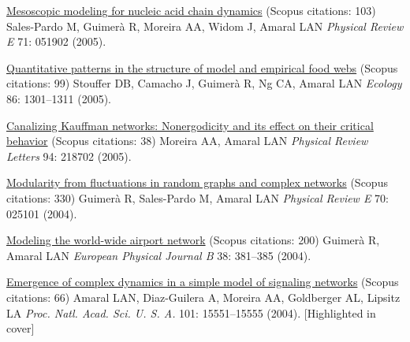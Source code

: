 \NumberedItem{\makebox[0.8cm][r]{[60]}}
\href{/people/amaral/mesoscopic-modeling-for-nucleic-acid-chain-dynamics}
{Mesoscopic modeling for nucleic acid chain dynamics}
    (Scopus citations: 103)
\newline
Sales-Pardo M, Guimer\`a R, Moreira AA, Widom J, Amaral LAN
\newline
\textit{Physical Review E}
    71:
051902 (2005).
\newline
\Gap
~
\Gap

\NumberedItem{\makebox[0.8cm][r]{[59]}}
\href{/people/amaral/quantitative-patterns-in-the-structure-of-model-and-empirical-food-webs}
{Quantitative patterns in the structure of model and empirical food webs}
    (Scopus citations: 99)
\newline
Stouffer DB, Camacho J, Guimer\`a R, Ng CA, Amaral LAN
\newline
\textit{Ecology}
    86:
1301--1311 (2005).
\newline
\Gap
~
\Gap

\NumberedItem{\makebox[0.8cm][r]{[58]}}
\href{/people/amaral/canalizing-kauffman-networks-nonergodicity-and-its-effect-on-their-critical-behavior}
{Canalizing Kauffman networks: Nonergodicity and its effect on their critical behavior}
    (Scopus citations: 38)
\newline
Moreira AA, Amaral LAN
\newline
\textit{Physical Review Letters}
    94:
218702 (2005).
\newline
\Gap
~
\Gap

\NumberedItem{\makebox[0.8cm][r]{[57]}}
\href{/people/amaral/modularity-from-fluctuations-in-random-graphs-and-complex-networks}
{Modularity from fluctuations in random graphs and complex networks}
    (Scopus citations: 330)
\newline
Guimer\`a R, Sales-Pardo M, Amaral LAN
\newline
\textit{Physical Review E}
    70:
025101 (2004).
\newline
\Gap
~
\Gap

\NumberedItem{\makebox[0.8cm][r]{[56]}}
\href{/people/amaral/modeling-the-world-wide-airport-network}
{Modeling the world-wide airport network}
    (Scopus citations: 200)
\newline
Guimer\`a R, Amaral LAN
\newline
\textit{European Physical Journal B}
    38:
381--385 (2004).
\newline
\Gap
~
\Gap

\NumberedItem{\makebox[0.8cm][r]{[55]}}
\href{/people/amaral/emergence-of-complex-dynamics-in-a-simple-model-of-signaling-networks}
{Emergence of complex dynamics in a simple model of signaling networks}
    (Scopus citations: 66)
\newline
Amaral LAN, Diaz-Guilera A, Moreira AA, Goldberger AL, Lipsitz LA
\newline
\textit{Proc. Natl. Acad. Sci. U. S. A.}
    101:
15551--15555 (2004).
    [Highlighted in cover]
\newline
\Gap
~
\Gap

